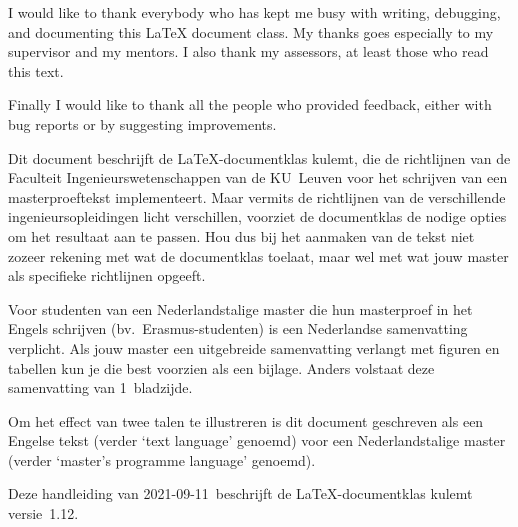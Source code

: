 \documentclass[master=elt,masteroption=im,english,oneside]{kulemt}
\newcommand*\classversion{1.12}
\newcommand*\manualdate{2021-09-11}
\newcommand*\cls[1]{\textsf{#1}}
\newcommand\English[1]{`\foreignlanguage{english}{#1}'}
\begin{document}
\begin{preface}
  I would like to thank everybody who has kept me busy with writing,
  debugging, and documenting this LaTeX document class. My thanks goes
  especially to my supervisor and my mentors. I also thank my assessors,
  at least those who read this text.

  Finally I would like to thank all the people who provided feedback,
  either with bug reports or by suggesting improvements.
\end{preface}

\tableofcontents*

\begin{abstract}
  This document describes the use of the LaTeX document class \cls{kulemt},
  which implements the KU~Leuven Faculty of Engineering guidelines for writing
  a master's thesis. Since there are slight differences between the actual
  guidelines of the different engineering master's programmes, this class
  implements not only the common part, but it also provides the necessary
  options to adapt it to the specific requirements. So please check the
  guidelines of your master's programme before using or tweaking typesetting
  options.

  To illustrate the difference between the main text language and the master's
  programme language, this document is written in English (as the main text
  language) for a Dutch master's programme.

  This manual (dated \manualdate) describes the \cls{kulemt} class
  version~\classversion.
\end{abstract}

\begin{abstract*}
  Dit document beschrijft de LaTeX-documentklas \cls{kulemt}, die de
  richtlijnen van de Faculteit Ingenieurswetenschappen van de KU~Leuven
  voor het schrijven van een masterproeftekst implementeert. Maar vermits
  de richtlijnen van de verschillende ingenieursopleidingen licht
  verschillen, voorziet de documentklas de nodige opties om het resultaat
  aan te passen. Hou dus bij het aanmaken van de tekst niet zozeer rekening
  met wat de documentklas toelaat, maar wel met wat jouw master als
  specifieke richtlijnen opgeeft.

  Voor studenten van een Nederlandstalige master die hun masterproef in het
  Engels schrijven (bv.\ Erasmus-studenten) is een Nederlandse samenvatting
  verplicht. Als jouw master een uitgebreide samenvatting verlangt met
  figuren en tabellen kun je die best voorzien als een bijlage. Anders
  volstaat deze samenvatting van 1~bladzijde.

  Om het effect van twee talen te illustreren is dit document geschreven
  als een Engelse tekst (verder \English{text language} genoemd) voor een
  Nederlandstalige master (verder \English{master's programme language}
  genoemd).

  Deze handleiding van \manualdate\ beschrijft de LaTeX-documentklas
  \cls{kulemt} versie~\classversion.
\end{abstract*}
\end{document}
